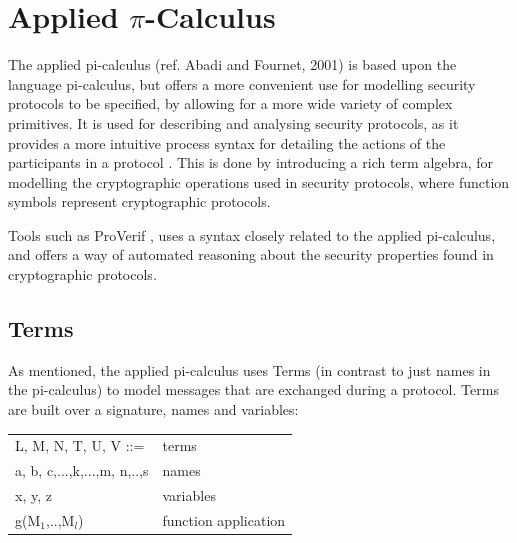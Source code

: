 \section{Applied $\pi$-Calculus}

The applied pi-calculus (ref. Abadi and Fournet, 2001) is based upon the language pi-calculus, but offers a more convenient use for modelling security protocols to be specified, by allowing for a more wide variety of complex primitives. It is used for describing and analysing security protocols, as it provides a more intuitive process syntax for detailing the actions of the participants in a protocol \autocite{AplliedPiCalsulus2010}. This is done by introducing a rich term algebra, for modelling the cryptographic operations used in security protocols, where function symbols represent cryptographic protocols. 

Tools such as ProVerif \autocite{ProVerif}, uses a syntax closely related to the applied pi-calculus, and offers a way of automated reasoning about the security properties found in cryptographic protocols. \\

\subsection{Terms}
As mentioned, the applied pi-calculus uses Terms (in contrast to just names in the pi-calculus) to model messages that are exchanged during a protocol. Terms are built over a signature, names and variables\autocite{AplliedPiCalsulus2010}: \\
\begin{center}
	\begin{tabular} { l l }
 		L, M, N, T, U, V ::= & terms \\ 
 		a, b, c,...,k,...,m, n,..,s & names \\  
 		x, y, z & variables \\
 		g(M$_{1}$,..,M$_{l}$) & function application
	\end{tabular}
\end{center}


